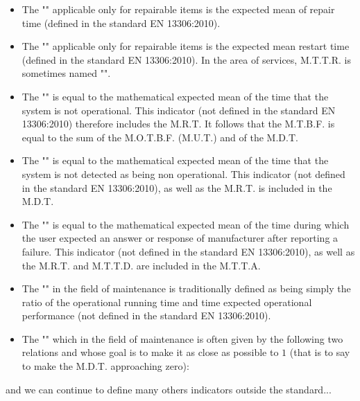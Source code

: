 \begin{itemize}
		\item The "" applicable only for repairable items is the expected mean of repair time (defined in the standard EN 13306:2010).
		
		\item The "" applicable only for repairable items is the expected mean restart time (defined in the standard EN 13306:2010). In the area of services, M.T.T.R. is sometimes named "".
		
		\item The "" is equal to the mathematical expected mean of the time that the system is not operational. This indicator (not defined in the standard EN 13306:2010) therefore includes the M.R.T. It follows that the M.T.B.F. is equal to the sum of the M.O.T.B.F. (M.U.T.) and of the M.D.T.
		
		\item The "" is equal to the mathematical expected mean of the time that the system is not detected as being non operational. This indicator (not defined in the standard EN 13306:2010), as well as the M.R.T. is included in the M.D.T.
		
		\item The "" is equal to the mathematical expected mean of the time during which the user expected an answer or response of manufacturer after reporting a failure. This indicator (not defined in the standard EN 13306:2010), as well as the M.R.T. and M.T.T.D. are included in the M.T.T.A.
		
		\item The "" in the field of maintenance is traditionally defined as being simply the ratio of the operational running time and time expected operational performance (not defined in the standard EN 13306:2010).
		
		\item The "" which in the field of maintenance is often given by the following two relations and whose goal is to make it as close as possible to $1$ (that is to say to make the M.D.T. approaching zero):
		
	\end{itemize}
	and we can continue to define many others indicators outside the standard...
	
